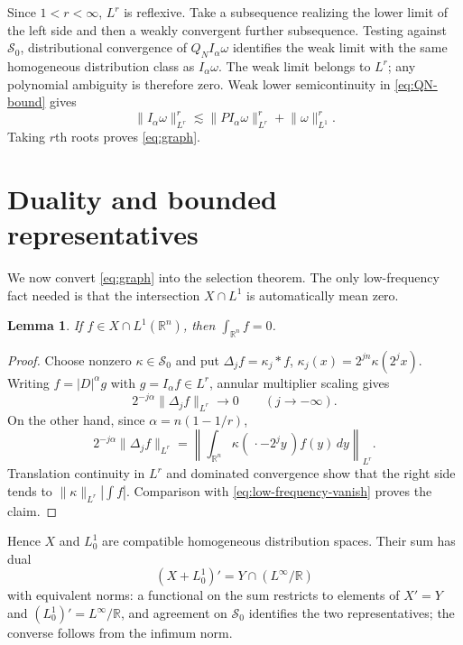 \documentclass[11pt]{amsart}
\numberwithin{equation}{section}
\newtheorem{lemma}[theorem]{Lemma}
\theoremstyle{definition}
\theoremstyle{remark}
\newcommand{\R}{\mathbb R}
\newcommand{\cS}{\mathcal S}
\newcommand{\norm}[1]{\lVert #1\rVert}
\begin{document}
Since $1<r<\infty$, $L^r$ is reflexive.  Take a subsequence realizing the
lower limit of the left side and then a weakly convergent further subsequence.
Testing against $\cS_0$, distributional convergence of
$Q_N I_\alpha\omega$ identifies the weak limit with the same homogeneous
distribution class as $I_\alpha\omega$.  The weak limit belongs to $L^r$;
any polynomial ambiguity is therefore zero.  Weak lower semicontinuity in
\eqref{eq:QN-bound} gives
\begin{equation}\label{eq:full-graph-r}
 \norm{I_\alpha\omega}_{L^r}^r
 \lesssim
 \norm{P I_\alpha\omega}_{L^r}^r+\norm{\omega}_{L^1}^r.
\end{equation}
Taking $r$th roots proves \eqref{eq:graph}.

\section{Duality and bounded representatives}\label{sec:duality}

We now convert \eqref{eq:graph} into the selection theorem.  The only
low-frequency fact needed is that the intersection $X\cap L^1$ is
automatically mean zero.

\begin{lemma}\label{lem:critical-mean-zero}
If $f\in X\cap L^1(\R^n)$, then $\int_{\R^n}f=0$.
\end{lemma}

\begin{proof}
Choose nonzero $\kappa\in\cS_0$ and put
$\Delta_jf=\kappa_j*f$, $\kappa_j(x)=2^{jn}\kappa(2^jx)$.
Writing $f=|D|^\alpha g$ with $g=I_\alpha f\in L^r$, annular multiplier
scaling gives
\begin{equation}\label{eq:low-frequency-vanish}
 2^{-j\alpha}\norm{\Delta_jf}_{L^r}\longrightarrow0
 \qquad(j\to-\infty).
\end{equation}
On the other hand, since $\alpha=n(1-1/r)$,
\begin{equation}\label{eq:low-frequency-mass}
 2^{-j\alpha}\norm{\Delta_jf}_{L^r}
 =\left\|\int_{\R^n}\kappa(\,\cdot-2^jy\,)f(y)\,dy\right\|_{L^r}.
\end{equation}
Translation continuity in $L^r$ and dominated convergence show that the
right side tends to $\norm\kappa_{L^r}|\int f|$.  Comparison with
\eqref{eq:low-frequency-vanish} proves the claim.
\end{proof}

Hence $X$ and $L^1_0$ are compatible homogeneous distribution spaces.  Their
sum has dual
\begin{equation}\label{eq:sum-dual}
 (X+L^1_0)'=Y\cap(L^\infty/\R)
\end{equation}
with equivalent norms: a functional on the sum restricts to elements of
$X'=Y$ and $(L^1_0)'=L^\infty/\R$, and agreement on $\cS_0$ identifies the
two representatives; the converse follows from the infimum norm.
\end{document}
